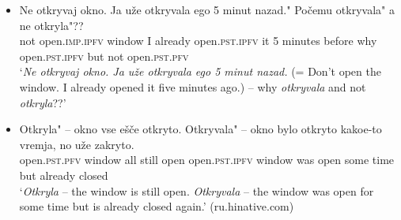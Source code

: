 \documentclass[output=paper,colorlinks,citecolor=brown]{langscibook}
\begin{document}
\ea\label{someone}
\begin{itemize}
\item[A:] \gll {} Ne otkryvaj okno.  Ja uže otkryvala ego 5 minut nazad."  Počemu  otkryvala"  a ne  otkryla"?? \\
{} not open.\textsc{imp.ipfv} window I already open.\textsc{pst.ipfv} it 5 minutes before why {} open.\textsc{pst.ipfv} but not {} open.\textsc{pst.pfv} \\
\glt `\textit{Ne otkryvaj okno. Ja uže otkryvala ego 5 minut nazad.} (= Don't open the window. I already opened it five minutes ago.) -- why \textit{otkryvala} and not \textit{otkryla}??'
\item[B:] \gll {} Otkryla" -- okno vse ešče otkryto.  Otkryvala" -- okno bylo otkryto kakoe-to vremja, no uže zakryto. \\
{} open.\textsc{pst.pfv} {} window all still open {} open.\textsc{pst.ipfv} {} window was open some time but already closed\\
\glt `\textit{Otkryla} -- the window is still open. \textit{Otkryvala} -- the window was open for some time but is already closed again.' \hfill (ru.hinative.com)
\end{itemize}
\z



\end{document}
